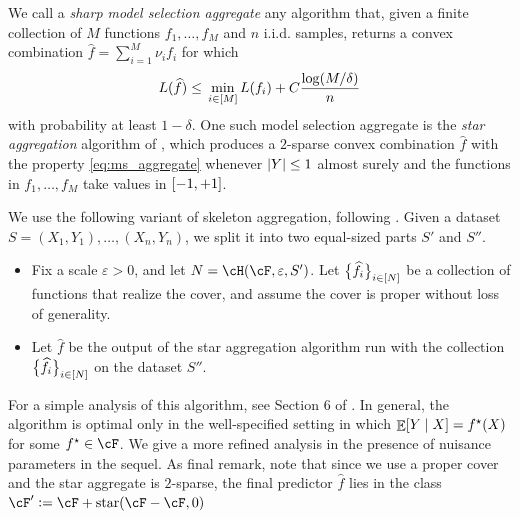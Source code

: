 \documentclass[11pt]{article} %
\newcommand{\journal}[1]{\iftoggle{journal}{#1}{}}
\newcommand{\preprint}[1]{\iftoggle{journal}{}{#1}}
\newcommand{\pref}[1]{\cref{#1}}
\theoremstyle{theorem}  %
\theoremstyle{plain}
\DeclarePairedDelimiter{\abs}{\lvert}{\rvert} %
\DeclarePairedDelimiter{\brk}{[}{]}
\DeclarePairedDelimiter{\crl}{\{}{\}}
\DeclareMathOperator{\En}{\mathbb{E}}
\newcommand{\veps}{\varepsilon}
\newcommand{\ldef}{\vcentcolon=}
\newcommand{\wh}[1]{\widehat{#1}}
\newcommand{\unitrange}{\brk*{-1,+1}}
\newcommand{\starhull}{\mathrm{star}}
\newcommand{\footnoteorhide}[1]{\preprint{\footnote{#1}}\journal{}}
\begin{document}
We call a \emph{sharp model selection aggregate} any algorithm that, given a finite collection of $M$ functions $f_1,\ldots,f_M$ and $n$ i.i.d. samples, returns a convex combination $\wh{f}=\sum_{i=1}^{M}\nu_if_i$ for which
\begin{equation}
\label{eq:ms_aggregate}
L(\wh{f})\leq{} \min_{i\in\brk*{M}}L(f_i) + C\frac{\log(M/\delta)}{n}
\end{equation}
with probability at least $1-\delta$. One such model selection aggregate is the \emph{star aggregation} algorithm of \cite{audibert2008progressive}, which produces a $2$-sparse convex combination $\wh{f}$ with the property \pref{eq:ms_aggregate} whenever $\abs*{Y}\leq1$ almost surely and the functions in $f_1,\ldots,f_M$ take values in $\unitrange$.

We use the following variant of skeleton aggregation, following \cite{rakhlin2017empirical}. Given a dataset $S=(X_1,Y_1),\ldots,(X_n,Y_n)$, we split it into two equal-sized parts $S'$ and $S''$.
\begin{itemize}
\item Fix a scale $\veps>0$, and let $N=\cH(\cF,\veps,S')$. Let $\crl[\big]{\wh{f}_i}_{i\in\brk*{N}}$ be a collection of functions that realize the cover, and assume the cover is proper without loss of generality.\footnoteorhide{Any improper $\veps$-cover can be made into a proper $2\veps$-cover.} 
\item Let $\wh{f}$ be the output of the star aggregation algorithm run with the collection $\crl[\big]{\wh{f}_i}_{i\in\brk*{N}}$ on the dataset $S''$.
\end{itemize}
For a simple analysis of this algorithm, see Section 6 of \cite{rakhlin2017empirical}. In general, the algorithm is optimal only in the well-specified setting in which $\En\brk*{Y\mid{}X}=f^{\star}(X)$ for some $f^{\star}\in\cF$. We give a more refined analysis in the presence of nuisance parameters in the sequel. As final remark, note that since we use a proper cover and the star aggregate is $2$-sparse, the final predictor $\wh{f}$ lies in the class $\cF'\ldef\cF + \starhull(\cF-\cF,0)$
\end{document}
